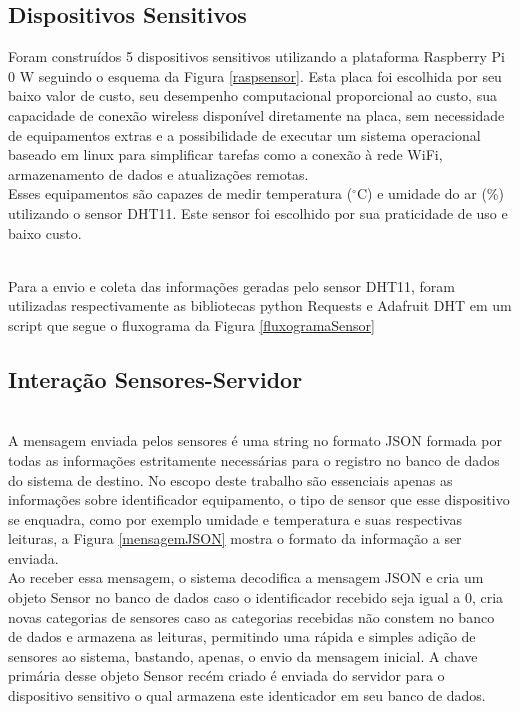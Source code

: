 \subsection{Dispositivos Sensitivos}
\quad Foram construídos 5 dispositivos sensitivos utilizando a plataforma Raspberry Pi 0 W seguindo o esquema da Figura \ref{raspsensor}. Esta placa
foi escolhida por seu baixo valor de custo, seu desempenho computacional proporcional ao custo, sua capacidade de conexão wireless disponível diretamente na placa, sem necessidade de equipamentos extras e a possibilidade de executar um sistema operacional baseado em linux para simplificar tarefas como a conexão à rede WiFi, armazenamento de dados e atualizações remotas.
\newpage
\\\null \quad Esses equipamentos são capazes de medir temperatura ($^\circ$C) e umidade do ar (\%) utilizando o sensor DHT11. Este sensor foi escolhido
por sua praticidade de uso e baixo custo.

\\\null \quad Para a envio e coleta das informações geradas pelo sensor DHT11, foram utilizadas respectivamente as bibliotecas python Requests \cite{Requests} e Adafruit DHT \cite{AdafruitDHT} em um script que segue o fluxograma da Figura \ref{fluxogramaSensor}

\newpage
\subsection{Interação Sensores-Servidor}

\\\null \quad A mensagem enviada pelos sensores é uma string no formato JSON formada por todas as informações estritamente necessárias para o registro no banco de dados do sistema de destino.
No escopo deste trabalho são essenciais apenas as informações sobre identificador equipamento, o tipo de sensor que esse dispositivo se enquadra, como por exemplo umidade e temperatura e suas respectivas leituras, a Figura \ref{mensagemJSON} mostra o formato da informação a ser enviada.
\\\null \quad Ao receber essa mensagem, o sistema decodifica a mensagem JSON e cria um objeto Sensor no banco de dados caso o identificador recebido seja igual a 0, cria novas categorias de sensores caso as categorias recebidas não constem no banco de dados e armazena as leituras, permitindo uma rápida e simples adição de sensores ao sistema, bastando, apenas, o envio da mensagem inicial. A chave primária desse objeto Sensor recém criado é enviada do servidor para o dispositivo sensitivo o qual armazena este identicador em seu banco de dados.

